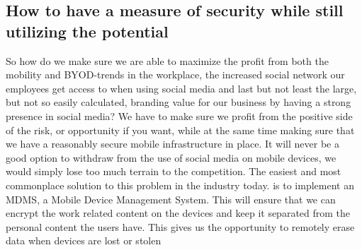 \subsection*{How to have a measure of security while still utilizing the potential}
So how do we make sure we are able to maximize the profit from both the mobility and BYOD-trends in the workplace, the increased social network our employees get access to when using social media and last but not least the large, but not so easily calculated, branding value for our business by having a strong presence in social media?
We have to make sure we profit from the positive side of the risk, or opportunity if you want, while at the same time making sure that we have a reasonably secure mobile infrastructure in place. It will never be a good option to withdraw from the use of social media on mobile devices, we would simply lose too much terrain to the competition.
The easiest and most commonplace solution to this problem in the industry today. is to implement an MDMS, a Mobile Device Management System. This will ensure that we can encrypt the work related content on the devices and keep it separated from the personal content the users have. This gives us the opportunity to remotely erase data when devices are lost or stolen
